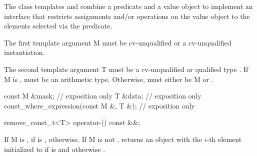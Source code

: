 \pnum The class templates  and  combine a predicate and a value object to implement an interface that restricts assignments and/or operations on the value object to the elements selected via the predicate.

\pnum The first template argument \type M must be cv-unqualified \bool or a cv-unqualified \mask instantiation.

\pnum The second template argument \type T must be a cv-unqualified or \const qualified type .
If \type M is \bool,  must be an arithmetic type.
Otherwise,  must either be \type M or .

\begin{itemdecl}
const M &mask;                           // exposition only
T &data;                                 // exposition only
const_where_expression(const M &, T &);  // exposition only
\end{itemdecl}
\begin{itemdescr}
  \pnum{}

  \pnum{}
\end{itemdescr}

\begin{itemdecl}
remove_const_t<T> operator-() const &&;
\end{itemdecl}
\begin{itemdescr}
  \pnum\returns If \type M is \bool,  if  is \true,  otherwise.
  If \type M is not \bool, returns an object with the $i$-th element initialized to  if  is \true and  otherwise \foralli[M::].
\end{itemdescr}

